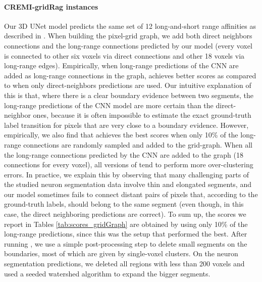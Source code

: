 \paragraph{CREMI-gridRag instances} 
Our 3D UNet model predicts the same set of 12 long-and-short range affinities as described in \cite{lee2017superhuman}. 
When building the pixel-grid graph, we add both direct neighbors connections and the long-range connections predicted by our model (every voxel is connected to other six voxels via direct connections and other 18 voxels via long-range edges).
Empirically, when long-range predictions of the CNN are added as long-range connections in the graph, \algname{} achieves better scores as compared to when only direct-neighbors predictions are used.
Our intuitive explanation of this is that, where there is a clear boundary evidence between two segments, the long-range predictions of the CNN model are more certain than the direct-neighbor ones, because it is often impossible to estimate the exact ground-truth label transition for pixels that are very close to a boundary evidence. 
However, empirically, we also find that \algname{} achieves the best scores when only 10\% of the long-range connections are randomly sampled and added to the grid-graph. When all the long-range connections predicted by the CNN are added to the graph (18 connections for every voxel), all versions of \algname{} tend to perform more over-clustering errors.
In practice, we explain this by observing that many challenging parts of the studied neuron segmentation data involve thin and elongated segments, and our model sometimes fails to connect distant pairs of pixels that, according to the ground-truth labels, should belong to the same segment (even though, in this case, the direct neighboring predictions are correct).
To sum up, the scores we report in Tables \ref{tab:scores_gridGraph} are obtained by using only 10\% of the long-range predictions, since this was the setup that performed the best.
After running \algname{}, we use a simple post-processing step to delete small segments on the boundaries, most of which are given by single-voxel clusters. On the neuron segmentation predictions, we deleted all regions with less than 200 voxels and used a seeded watershed algorithm to expand the bigger segments.



